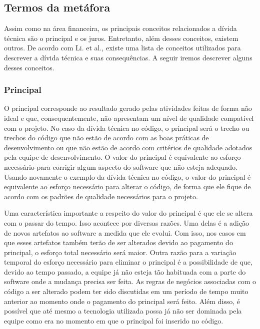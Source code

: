 \subsection{Termos da metáfora}
\label{elementos_td}

Assim como na área financeira, os principais conceitos relacionados a dívida técnica são o principal e os juros. Entretanto, além desses conceitos, existem outros. De acordo com Li. et al.\cite{li2015systematic}, existe uma lista de conceitos utilizados para descrever a dívida técnica e suas consequências. A seguir iremos descrever alguns desses conceitos.


\subsubsection{Principal}
O principal corresponde ao resultado gerado pelas atividades feitas de forma não ideal e que, consequentemente, não apresentam um nível de qualidade compatível com o projeto. No caso da dívida técnica no código, o principal será o trecho ou trechos do código que não estão de acordo com as boas práticas de desenvolvimento ou que não estão de acordo com critérios de qualidade adotados pela equipe de desenvolvimento. O valor do principal é equivalente ao esforço necessário para corrigir algum aspecto do software que não esteja adequado. Usando novamente o exemplo da dívida técnica no código, o valor do principal é equivalente ao esforço necessário para alterar o código, de forma que ele fique de acordo com os padrões de qualidade necessários para o projeto.

Uma característica importante a respeito do valor do principal é que ele se altera com o passar do tempo. Isso acontece por diversas razões. Uma delas é a adição de novos artefatos ao software a medida que ele evolui. Com isso, nos casos em que esses artefatos também terão de ser alterados devido ao pagamento do principal, o esforço total necessário será maior. Outra razão para a variação temporal do esforço necessário para eliminar o principal é a possibilidade de que, devido ao tempo passado, a equipe já não esteja tão habituada com a parte do software onde a mudança precisa ser feita. As regras de negócios associadas com o código a ser alterado podem ter sido discutidas em um período de tempo muito anterior ao momento onde o pagamento do principal será feito. Além disso, é possível que até mesmo a tecnologia utilizada possa já não ser dominada pela equipe como era no momento em que o principal foi inserido no código. 

